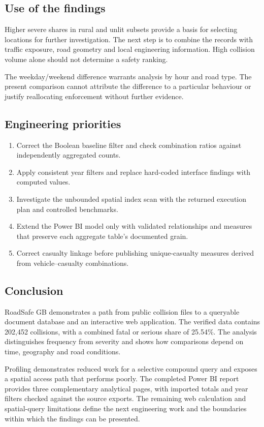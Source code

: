 \documentclass[11pt,a4paper]{article}
\begin{document}
\subsection{Use of the findings}
Higher severe shares in rural and unlit subsets provide a basis for selecting locations for further investigation. The next step is to combine the records with traffic exposure, road geometry and local engineering information. High collision volume alone should not determine a safety ranking.

The weekday/weekend difference warrants analysis by hour and road type. The present comparison cannot attribute the difference to a particular behaviour or justify reallocating enforcement without further evidence.
\subsection{Engineering priorities}
\begin{enumerate}
\item Correct the Boolean baseline filter and check combination ratios against independently aggregated counts.
\item Apply consistent year filters and replace hard-coded interface findings with computed values.
\item Investigate the unbounded spatial index scan with the returned execution plan and controlled benchmarks.
\item Extend the Power BI model only with validated relationships and measures that preserve each aggregate table's documented grain.
\item Correct casualty linkage before publishing unique-casualty measures derived from vehicle--casualty combinations.
\end{enumerate}
\subsection{Conclusion}
RoadSafe GB demonstrates a path from public collision files to a queryable document database and an interactive web application. The verified data contains 202,452 collisions, with a combined fatal or serious share of 25.54\%. The analysis distinguishes frequency from severity and shows how comparisons depend on time, geography and road conditions.

Profiling demonstrates reduced work for a selective compound query and exposes a spatial access path that performs poorly. The completed Power BI report provides three complementary analytical pages, with imported totals and year filters checked against the source exports. The remaining web calculation and spatial-query limitations define the next engineering work and the boundaries within which the findings can be presented.
\end{document}
